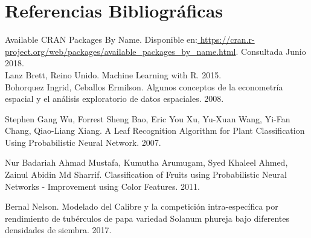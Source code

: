 
\chapter*{Referencias Bibliográficas}

\noindent
Available CRAN Packages By Name. Disponible en:\url{ https://cran.r-project.org/web/packages/available_packages_by_name.html}. Consultada Junio 2018.\\

\noindent
Lanz Brett, Reino Unido. Machine Learning with R. 2015. \\

\noindent
Bohorquez Ingrid, Ceballos Ermilson. Algunos conceptos de la econometría espacial y el análisis exploratorio de datos espaciales. 2008.

\noindent
Stephen Gang Wu, Forrest Sheng Bao, Eric You Xu, Yu-Xuan Wang, Yi-Fan Chang, Qiao-Liang Xiang. A Leaf Recognition Algorithm for Plant Classification Using Probabilistic Neural Network. 2007.

\noindent
Nur Badariah Ahmad Mustafa, Kumutha Arumugam, Syed Khaleel Ahmed, Zainul Abidin Md Sharrif. Classification of Fruits using Probabilistic Neural Networks - Improvement using Color Features. 2011.

Bernal Nelson. Modelado del Calibre y la competición intra-específica por rendimiento de tubérculos de papa variedad Solanum phureja bajo diferentes densidades de siembra. 2017.

